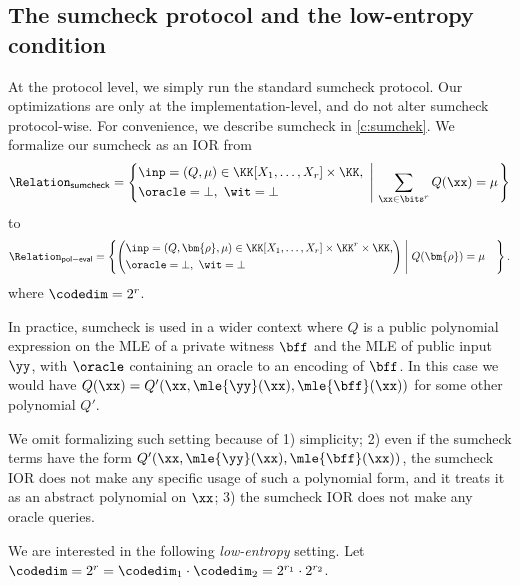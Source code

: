\subsection{The sumcheck protocol and the low-entropy condition}
At the protocol level, we simply run the standard sumcheck protocol. Our optimizations are only at the implementation-level, and do not alter  sumcheck protocol-wise. For convenience, we describe  sumcheck  in \cref{c:sumchek}. We formalize our  sumcheck  as an IOR from   
%
$$
\Relation_{\mathsf{sumcheck}} = \left\{  \begin{aligned} &\inp=(Q,\mu)\in \KK[X_1,\ldots, X_r]\times  \KK,\\ &\oracle=\bot, \ \wit=\bot \end{aligned}   \ \left|  \ \sum_{\xx\in \bits^r} Q(\xx)=\mu \right.\right\}
$$
 to
$$
\Relation_{\mathsf{pol-eval}}  = \left\{ \left(\begin{aligned} &\inp=(Q, \bm{\rho},\mu)\in \KK[X_1,\ldots, X_r]\times \KK^r \times \KK, \\
&\oracle=\bot,
\ \wit= \bot\end{aligned}\right) \;\middle|\;  \begin{aligned} 
&Q(\bm{\rho}) = \mu  \end{aligned}\right\}.
$$
where $\codedim=2^r$. 
%
\begin{remark}
    In practice, sumcheck is used in a wider context where $Q$ is a public polynomial expression on the MLE of a private witness $\bff$ and the MLE of public input $\yy$, with $\oracle$ containing an oracle to an encoding of $\bff$. In this case we would have $Q(\xx)= Q'(\xx,\mle{\yy}(\xx), \mle{\bff}(\xx))$ for some other polynomial $Q'$. 
    
    We omit formalizing such setting because of 1) simplicity; 2) even if the sumcheck terms have the form $Q'(\xx,\mle{\yy}(\xx), \mle{\bff}(\xx))$, the sumcheck IOR does not make any specific usage of such a polynomial form, and it treats it as an abstract polynomial on $\xx$; 3) the sumcheck IOR does not make any oracle queries.
\end{remark}


We are interested in the following \emph{low-entropy} setting.  Let $\codedim= 2^r=\codedim_1\cdot \codedim_2 = 2^{r_1} \cdot 2^{r_2}$.

\newcommand{\setsize}{s}

